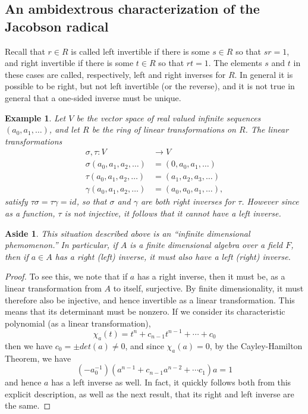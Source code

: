 \documentclass[12pt]{report}
\theoremstyle{plain}
\newtheorem{aside}[thm]{Aside}
\newtheorem{ex}[thm]{Example}
\begin{document}
\subsection{An ambidextrous characterization of the Jacobson radical}

Recall that $r \in R$ is called left invertible if there is some $s \in R$ so
that $sr = 1$, and right invertible if there is some $t \in R$ so that $rt
= 1$. The elements $s$ and $t$ in these cases are called, respectively,
left and right inverses for $R$. In general it is possible to be right, but
not left invertible (or the reverse), and it is not true in general that a
one-sided inverse must be unique.

\begin{ex}
Let $V$ be the vector space of real valued infinite sequences $(a_0, a_1,
\ldots)$, and let $R$ be the ring of linear transformations on $R$. The
linear transformations
\begin{align*}
\sigma, \tau : V &\to V \\
\sigma(a_0, a_1, a_2, \ldots) &= (0, a_0, a_1, \ldots) \\
\tau(a_0, a_1, a_2, \ldots) &= (a_1, a_2, a_3, \ldots) \\
\gamma(a_0, a_1, a_2, \ldots) &= (a_0, a_0, a_1, \ldots),
\end{align*}
satisfy $\tau \sigma = \tau \gamma = id$, so that $\sigma$ and $\gamma$
are both right inverses for $\tau$. However since as a function, $\tau$ is
not injective, it follows that it cannot have a left inverse.
\end{ex}

\begin{aside}
This situation described above is an ``infinite dimensional phemomenon.''
In particular, if $A$ is a finite dimensional algebra over a field $F$,
then if $a \in A$ has a right (left) inverse, it must also have a left
(right) inverse. 
\end{aside}
\begin{proof}
To see this, we note that if $a$ has a right inverse, then
it must be, as a linear transformation from $A$ to itself, surjective. By
finite dimensionality, it must therefore also be injective, and hence
invertible as a linear transformation. This means that its determinant must
be nonzero. If we consider its characteristic polynomial (as a linear
transformation),
\[\chi_a(t) = t^n + c_{n-1} t^{n-1} + \cdots + c_0\]
then we have $c_0 = \pm det(a) \neq 0$, and since $\chi_a(a) = 0$,
by the Cayley-Hamilton Theorem, we have
\[(-a_0^{-1})(a^{n-1} + c_{n-1} a^{n-2} + \cdots c_1) a = 1\]
and hence $a$ has a left inverse as well. In fact, it quickly follows both
from this explicit description, as well as the next result, that its right
and left inverse are the same.
\end{proof}
\end{document}

